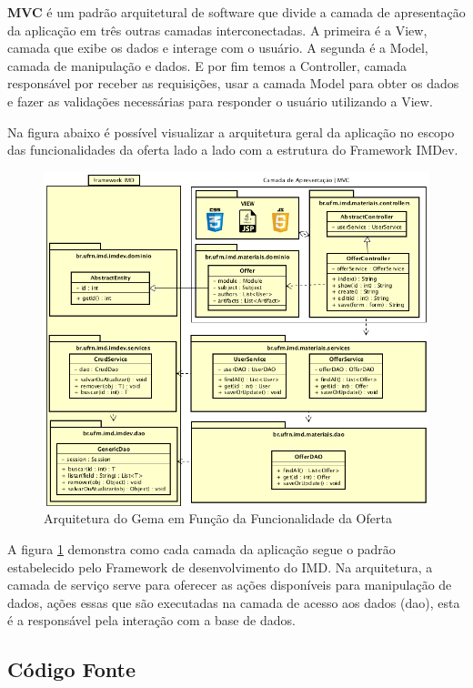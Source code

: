\textbf{MVC} é um padrão arquitetural de software que divide a camada de apresentação da aplicação em três outras camadas interconectadas. A primeira é a View, camada que exibe os dados e interage com o usuário. A segunda é a Model, camada de manipulação e dados. E por fim temos a Controller, camada responsável por receber as requisições, usar a camada Model para obter os dados e fazer as validações necessárias para responder o usuário utilizando a View. 

Na figura abaixo é possível visualizar a arquitetura geral da aplicação no escopo das funcionalidades da oferta lado a lado com a estrutura do Framework IMDev.

\begin{figure}[H]
\centering
     \includegraphics[width=1.0\textwidth]{Images/arq.png}
      \caption{Arquitetura do Gema em Função da Funcionalidade da Oferta}
       \label{fig:arq}
\end{figure}

A figura \hyperref[fig:arq]{\ref{fig:arq}} demonstra como cada camada da aplicação segue o padrão estabelecido pelo Framework de desenvolvimento do IMD. Na arquitetura, a camada de serviço serve para oferecer as ações disponíveis para manipulação de dados, ações essas que são executadas na camada de acesso aos dados (dao), esta é a responsável pela interação com a base de dados.

\subsection{Código Fonte}\label{sourceCode}

